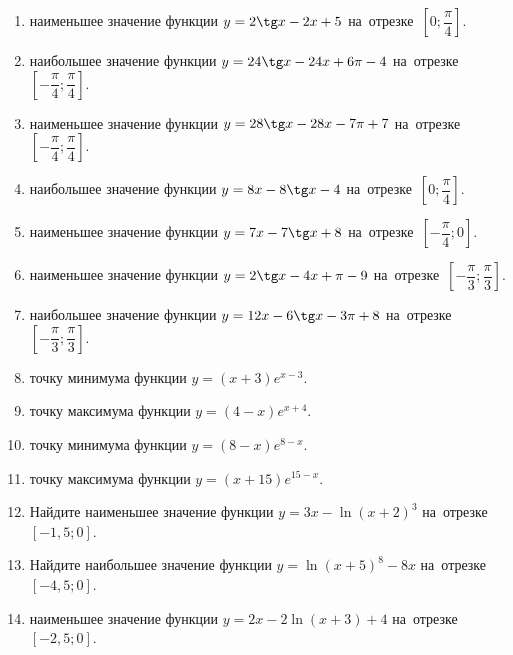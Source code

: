 \documentclass[a4paper,10pt]{article}
\begin{document}
\begin{enumerate}
\item {} наименьшее значение функции $y=2\tg x-2x+5$ на~отрезке~$\left[0;\dfrac{\pi }{4}\right]$.

\item {} наибольшее значение функции $y=24\tg x-24x+6\pi -4$ на~отрезке~$\left[-\dfrac{\pi }{4};\dfrac{\pi }{4}\right]$.

\item {} наименьшее значение функции $y=28\tg x-28x-7\pi +7$ на~отрезке~$\left[-\dfrac{\pi }{4};\dfrac{\pi }{4}\right]$.

\item {} наибольшее значение функции $y=8x-8\tg x-4$ на~отрезке~$\left[0;\dfrac{\pi }{4}\right]$.

\item {} наименьшее значение функции $y=7x-7\tg x+8$ на~отрезке~$\left[-\dfrac{\pi }{4};0\right]$.

\item {} наименьшее значение функции $y=2\tg x-4x+\pi -9$ на~отрезке~$\left[-\dfrac{\pi }{3};\dfrac{\pi }{3}\right]$.

\item {} наибольшее значение функции $y=12x-6\tg x-3\pi +8$ на~отрезке~$\left[-\dfrac{\pi }{3};\dfrac{\pi }{3}\right]$.

\item {} точку минимума функции $y=\left(x+3\right)e^{x-3}$.

\item {} точку максимума функции $y=\left(4-x\right)e^{x+4}$.

\item {} точку минимума функции $y=\left(8-x\right)e^{8-x}$.

\item {} точку максимума функции $y=\left(x+15\right)e^{15-x}$.

\item Найдите наименьшее значение функции $y=3x-\ln \left(x+2\right)^3$ на~отрезке~$\left[-1,5;0\right]$.

\item Найдите наибольшее значение функции $y=\ln \left(x+5\right)^8-8x$ на~отрезке~$\left[-4,5;0\right]$.

\item {} наименьшее значение функции $y=2x-2\ln \left(x+3\right)+4$ на~отрезке~$\left[-2,5;0\right]$.


\end{enumerate}
\end{document}
